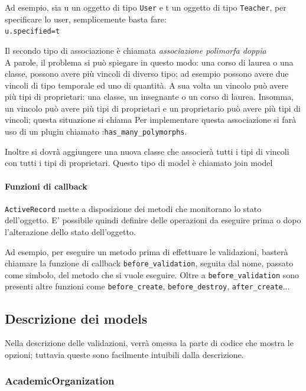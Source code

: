 \documentclass[11pt,a4paper]{article}
\begin{document}
Ad esempio, sia u un oggetto di tipo \verb|User| e t un oggetto di tipo \verb|Teacher|, per specificare lo user, semplicemente basta fare:\\
\verb|u.specified=t|

Il secondo tipo di associazione è chiamata \textit{associazione polimorfa doppia}\\ 
A parole, il problema si può spiegare in questo modo: una corso di laurea o una classe, possono avere più vincoli di diverso tipo; ad esempio possono avere due vincoli di tipo temporale ed uno di quantità. A sua volta un vincolo può avere più tipi di proprietari: una classe, un insegnante o un corso di laurea.
Insomma, un vincolo può avere più tipi di proprietari e un proprietario può avere più tipi di vincoli; questa situazione si chiama 
Per implementare questa associazione si farà uso di un plugin chiamato :\verb|has_many_polymorphs|. 


Inoltre si dovrà aggiungere una nuova classe che associerà tutti i tipi di vincoli con tutti i tipi di proprietari. Questo tipo di model è chiamato join model




\paragraph{Funzioni di callback}
\verb|ActiveRecord| mette a disposizione dei metodi che monitorano lo stato dell'oggetto. 
E' possibile quindi definire delle operazioni da eseguire prima o dopo l'alterazione dello stato dell'oggetto.


Ad esempio, per eseguire un metodo prima di effettuare le validazioni, basterà chiamare la funzione di callback \verb|before_validation|, seguita dal nome, passato come simbolo, del metodo che si vuole eseguire.
Oltre a \verb|before_validation| sono presenti altre funzioni come \verb|before_create|, \verb|before_destroy|, \verb|after_create|...  

\subsection{Descrizione dei models}
Nella descrizione delle validazioni, verrà omessa la parte di codice che mostra le opzioni; tuttavia queste sono facilmente intuibili dalla descrizione.
\subsubsection{AcademicOrganization}
\end{document}

